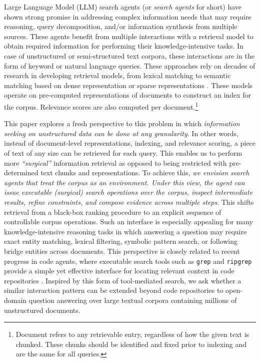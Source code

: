 \documentclass{article} %
\begin{document}
Large Language Model (LLM) search agents (or \textit{search agents} for short) \citep{search-o1,search-r1} have shown strong promise in addressing complex information needs that may require reasoning, query decomposition, and/or information synthesis from multiple sources. These agents benefit from multiple interactions with a retrieval model to obtain required information for performing their knowledge-intensive tasks. In case of unstructured or semi-structured text corpora, these interactions are in the form of keyword or natural language queries. These approaches rely on decades of research in developing retrieval models, from lexical matching \citep{TFIDF,bm25,QL} to semantic matching based on dense representation \citep{LSI,karpukhin2020dense} or sparse representations \citep{SNRM,SPLADE}. These models operate on pre-computed representations of documents to construct an index for the corpus. Relevance scores are also computed per document.\footnote{Document refers to any retrievable entry, regardless of how the given text is chunked. These chunks should be identified and fixed prior to indexing and are the same for all queries.}

This paper explores a fresh perspective to this problem in which \textit{information seeking on unstructured data can be done at any granularity}. In other words, instead of document-level representations, indexing, and relevance scoring, a piece of text of any size can be retrieved for each query. This enables us to perform more \textit{``surgical''} information retrieval as opposed to being restricted with pre-determined text chunks and representations. 
To achieve this, \textit{we envision search agents that treat the corpus as an environment. Under this view, the agent can issue executable (surgical) search operations over the corpus, inspect intermediate results, refine constraints, and compose evidence across multiple steps}. This shifts retrieval from a black-box ranking procedure to an explicit sequence of controllable corpus operations. Such an interface is especially appealing for many knowledge-intensive reasoning tasks in which answering a question may require exact entity matching, lexical filtering, symbolic pattern search, or following bridge entities across documents. This perspective is closely related to recent progress in code agents, where executable search tools such as \texttt{grep} and \texttt{ripgrep} provide a simple yet effective interface for locating relevant context in code repositories \citep{wang2026grepragempiricalstudyoptimization}. Inspired by this form of tool-mediated search, we ask whether a similar interaction pattern can be extended beyond code repositories to open-domain question answering over large textual corpora containing millions of unstructured documents.
\end{document}
